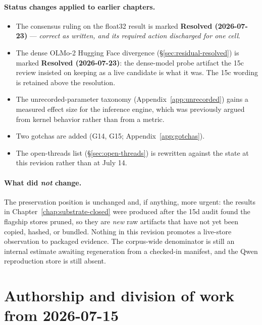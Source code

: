\documentclass[11pt]{report}
\newcommand{\statusResolved}{\textbf{Resolved (2026-07-23)}}
\begin{document}
\paragraph{Status changes applied to earlier chapters.}
\begin{itemize}[nosep]
  \item The consensus ruling on the float32 result is marked \statusResolved{} ---
        \emph{correct as written, and its required action discharged for one cell}.
  \item The dense OLMo-2 Hugging Face divergence
        (\S\ref{sec:residual-resolved}) is marked \statusResolved{}: the dense-model
        probe artifact the 15c review insisted on keeping as a live candidate is
        what it was. The 15c wording is retained above the resolution.
  \item The unrecorded-parameter taxonomy (Appendix~\ref{app:unrecorded}) gains a
        measured effect size for the inference engine, which was previously
        argued from kernel behavior rather than from a metric.
  \item Two gotchas are added (G14, G15; Appendix~\ref{app:gotchas}).
  \item The open-threads list (\S\ref{sec:open-threads}) is rewritten against the
        state at this revision rather than at July 14.
\end{itemize}

\paragraph{What did \emph{not} change.} The preservation position is unchanged and,
if anything, more urgent: the results in Chapter~\ref{chap:substrate-closed} were
produced after the 15d audit found the flagship stores pruned, so they are
\emph{new} raw artifacts that have not yet been copied, hashed, or bundled. Nothing
in this revision promotes a live-store observation to packaged evidence. The
corpus-wide denominator is still an internal estimate awaiting regeneration from a
checked-in manifest, and the Qwen reproduction store is still absent.

\section{Authorship and division of work from 2026-07-15}
\label{sec:rev-authorship}
\end{document}
